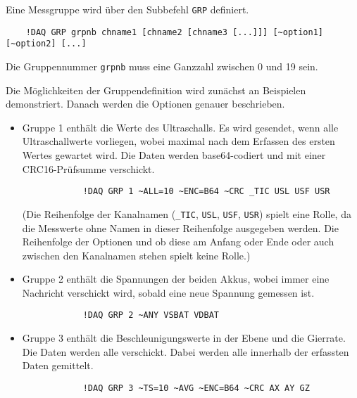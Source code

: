 Eine Messgruppe wird über den Subbefehl \verb|GRP| definiert.
\begin{verbatim}
	!DAQ GRP grpnb chname1 [chname2 [chname3 [...]]] [~option1] [~option2] [...]
\end{verbatim}
Die Gruppennummer \verb|grpnb| muss eine Ganzzahl zwischen 0 und 19 sein.

Die Möglichkeiten der Gruppendefinition wird zunächst an Beispielen demonstriert. Danach werden die Optionen genauer beschrieben.
\begin{itemize}
	\item Gruppe 1 enthält die Werte des Ultraschalls. Es wird gesendet, wenn alle Ultraschallwerte vorliegen, wobei maximal  nach dem Erfassen des ersten Wertes gewartet wird. Die Daten werden base64-codiert und mit einer CRC16-Prüfsumme verschickt.
		\begin{verbatim}
			!DAQ GRP 1 ~ALL=10 ~ENC=B64 ~CRC _TIC USL USF USR 
		\end{verbatim}
		(Die Reihenfolge der Kanalnamen (\verb|_TIC|, \verb|USL|, \verb|USF|, \verb|USR|) spielt eine Rolle, da die Messwerte ohne Namen in dieser Reihenfolge ausgegeben werden. Die Reihenfolge der Optionen und ob diese am Anfang oder Ende oder auch zwischen den Kanalnamen stehen spielt keine Rolle.)
	\item Gruppe 2 enthält die Spannungen der beiden Akkus, wobei immer eine Nachricht verschickt wird, sobald eine neue Spannung gemessen ist.
		\begin{verbatim}
			!DAQ GRP 2 ~ANY VSBAT VDBAT 
		\end{verbatim}
	\item Gruppe 3 enthält die Beschleunigungswerte in der Ebene und die Gierrate. Die Daten werden alle  verschickt. Dabei werden alle innerhalb der  erfassten Daten gemittelt.
		\begin{verbatim}
			!DAQ GRP 3 ~TS=10 ~AVG ~ENC=B64 ~CRC AX AY GZ 
		\end{verbatim}
\end{itemize}


